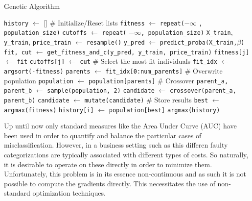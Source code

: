
\begin{algorithm}
\tiny
\caption{Genetic Algorithm}
\label{GA}
\begin{algorithmic}
\State \texttt{history} $\gets$ []
    \State \# Initialize/Reset lists
    \State \texttt{fitness} $\gets$ \texttt{repeat(}$-\infty$ \texttt{, population\_size)}
    \State \texttt{cutoffs} $\gets$ \texttt{repeat(} $-\infty$\texttt{, population\_size)}
        \State \texttt{X\_train}, \texttt{y\_train}, \texttt{price\_train} $\gets$ \texttt{resample()}
    \EndIf   
        \State \texttt{y\_pred} $\gets$ \texttt{predict\_proba(X\_train,}$\beta$\texttt{)}
        \State \texttt{fit, cut} $\gets$ \texttt{get\_fitness\_and\_c(y\_pred, y\_train, price\_train)}
        \State \texttt{fitness[j]} $\gets$ \texttt{fit}
        \State \texttt{cutoffs[j]} $\gets$ \texttt{cut}
    \EndFor
    \State \# Select the most fit individuals
    \State \texttt{fit\_idx} $\gets$ \texttt{argsort(-fitness)}
    \State \texttt{parents} $\gets$ \texttt{fit\_idx[0:num\_parents]}
    \State \# Overwrite population
    \State \texttt{population} $\gets$ \texttt{population[parents]}
    \State \# Crossover
        \State \texttt{parent\_a, parent\_b} $\gets$ \texttt{sample(population, 2)}
        \State \texttt{candidate} $\gets$ \texttt{crossover(parent\_a, parent\_b)}
            \State \texttt{candidate} $\gets$ \texttt{mutate(candidate)}
        \EndIf
    \EndWhile
    \State \# Store results
    \State \texttt{best} $\gets$ \texttt{argmax(fitness)}
    \State \texttt{history[i]} $\gets$ \texttt{population[best]}
\EndFor
\State \Return \texttt{argmax(history)}
\end{algorithmic}
\end{algorithm}

Up until now only standard measures like the Area Under Curve (AUC) have been used in order to quantify and balance the particular cases of misclassification. However, in a business setting such as this differen faulty categorizations are typically associated with different types of costs. So naturally, it is desirable to operate on these directly in order to minimize them. Unfortunately, this problem is in its essence non-continuous and as such it is not possible to compute the gradients directly. This necessitates the use of non-standard optimization techniques.

